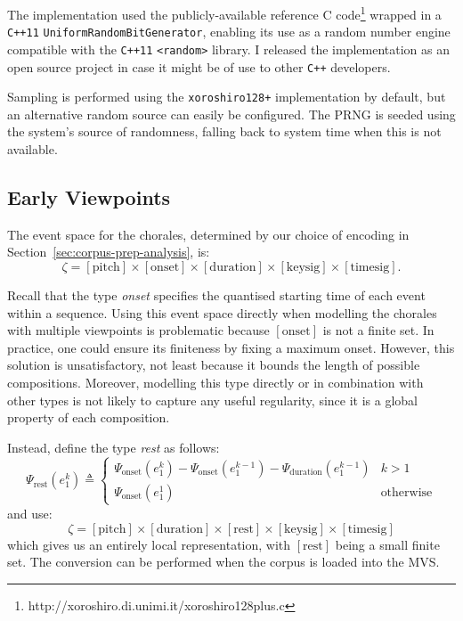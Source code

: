 \documentclass[12pt,a4paper,twoside,openright]{report}
\newcommand{\sref}[1]{Section~\ref{#1}}
\begin{document}
The implementation used the publicly-available reference C
code\footnote{http://xoroshiro.di.unimi.it/xoroshiro128plus.c} wrapped in a
\texttt{C++11} \texttt{UniformRandomBitGenerator}, enabling its use as a random
number engine compatible with the \texttt{C++11} \texttt{<random>} library. I
released the implementation as an open source project in case it might be of use
to other \texttt{C++} developers.

Sampling is performed using the \texttt{xoroshiro128+} implementation by
default, but an alternative random source can easily be configured. The PRNG is
seeded using the system's source of randomness, falling back to system time when
this is not available.

\subsection{Early Viewpoints}

The event space for the chorales, determined by our choice of encoding in
\sref{sec:corpus-prep-analysis}, is:
$$ \zeta = [\mathrm{pitch}] \times [\mathrm{onset}] \times [\mathrm{duration}]
\times [\mathrm{keysig}] \times [\mathrm{timesig}]. $$

Recall that the type \emph{onset} specifies the quantised starting time of each
event within a sequence. Using this event space directly when modelling the
chorales with multiple viewpoints is problematic because $[\mathrm{onset}]$ is
not a finite set. In practice, one could ensure its finiteness by fixing a
maximum onset. However, this solution is unsatisfactory, not least because it
bounds the length of possible compositions. Moreover, modelling this type
directly or in combination with other types is not likely to capture any useful
regularity, since it is a global property of each composition.

Instead, define the type \emph{rest} as follows:
$$ \Psi_{\mathrm{rest}}(e_1^k) \triangleq \begin{cases} 
  \Psi_{\mathrm{onset}}(e_1^k) -
  \Psi_{\mathrm{onset}}(e_1^{k-1}) - \Psi_{\mathrm{duration}}(e_1^{k-1}) & k > 1 \\
  \Psi_{\mathrm{onset}}(e_1^1) & \text{otherwise}
\end{cases} $$
and use:
$$ \zeta = [\mathrm{pitch}] \times [\mathrm{duration}] \times [\mathrm{rest}]
\times [\mathrm{keysig}] \times [\mathrm{timesig}] $$
which gives us an entirely local representation, with $[\mathrm{rest}]$ being a
small finite set. The conversion can be performed when the corpus is loaded into
the MVS. 
\end{document}
